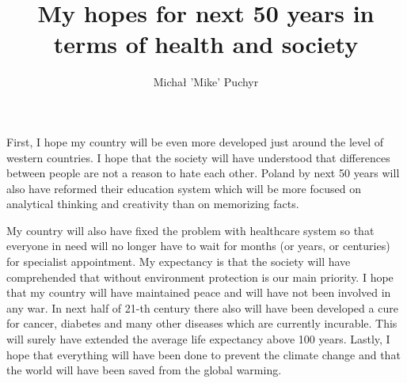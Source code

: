\documentclass[17pt]{extarticle}
\author{Michał 'Mike' Puchyr}
\date{}
\title{\textbf{My hopes for next 50 years in terms of health and society}}
\begin{document}
\maketitle
\begin{center}
    First, I hope my country will be even more developed just around the level of western countries.
    I hope that the society will have understood that differences between people are not a reason to hate each other.
    Poland by next 50 years will also have reformed their education system which will be more focused on analytical thinking and creativity than on memorizing facts.
    
    My country will also have fixed the problem with healthcare system so that everyone in need will no longer have to wait for months (or years, or centuries) for specialist appointment.
    My expectancy is that the society will have comprehended that without environment protection is our main priority.
    I hope that my country will have maintained peace and will have not been involved in any war.
    In next half of 21-th century there also will have been developed a cure for cancer, diabetes and many other diseases which are currently incurable.
    This will surely have extended the average life expectancy above 100 years.
    Lastly, I hope that everything will have been done to prevent the climate change and that the world will have been saved from the global warming.

\end{center}
\end{document}
